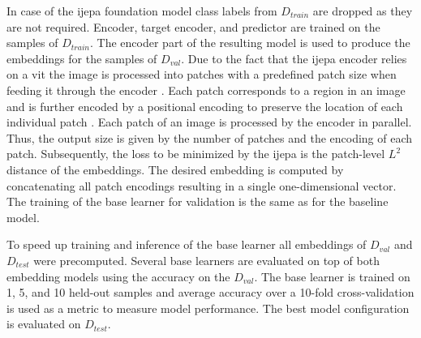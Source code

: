 In case of the \gls{ijepa} foundation model class labels from $D_{train}$ are dropped as they are not required. 
Encoder, target encoder, and predictor are trained on the samples of $D_{train}$. The encoder part of the resulting 
model is used to produce the embeddings for the samples of $D_{val}$. Due to the fact that the \gls{ijepa} encoder relies 
on a \gls{vit} the image is processed into patches with a predefined patch size when feeding it through the encoder 
\cite{dosovitskiy_image_2021}. Each patch corresponds to a region in an image and is further encoded by a positional 
encoding to preserve the location of each individual patch \cite{dosovitskiy_image_2021}. Each patch of an image 
is processed by the encoder in parallel. Thus, the output size is given by the number of patches and the encoding 
of each patch. Subsequently, the loss to be minimized by the \gls{ijepa} is the patch-level $L^2$ distance of the 
embeddings. The desired embedding is computed by concatenating all patch encodings resulting in a single one-dimensional 
vector. The training of the base learner for validation is the same as for the baseline model. 

To speed up training and inference of the base learner all embeddings of $D_{val}$ and $D_{test}$ were precomputed.
Several base learners are evaluated on top of both embedding models using the accuracy on the $D_{val}$. 
The base learner is trained on 1, 5, and 10 held-out samples and average accuracy over a 10-fold cross-validation is 
used as a metric to measure model performance. The best model configuration is evaluated on $D_{test}$.
